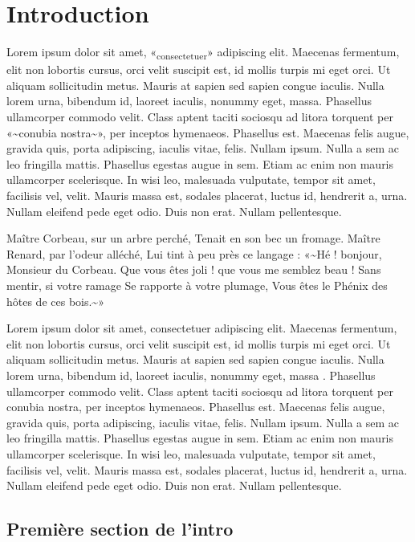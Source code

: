 \hypertarget{introduction}{%
\chapter*{Introduction}\label{introduction}}

Lorem ipsum dolor sit amet, «\textsubscript{consectetuer}» adipiscing
elit. Maecenas fermentum, elit non lobortis cursus, orci velit suscipit
est, id mollis turpis mi eget orci. Ut aliquam sollicitudin metus.
Mauris at sapien sed sapien congue iaculis. Nulla lorem urna, bibendum
id, laoreet iaculis, nonummy eget, massa. Phasellus ullamcorper commodo
velit. Class aptent taciti sociosqu ad litora torquent per
«\textasciitilde conubia nostra\textasciitilde», per inceptos hymenaeos.
Phasellus est. Maecenas felis augue, gravida quis, porta adipiscing,
iaculis vitae, felis. Nullam ipsum. Nulla a sem ac leo fringilla mattis.
Phasellus egestas augue in sem. Etiam ac enim non mauris ullamcorper
scelerisque. In wisi leo, malesuada vulputate, tempor sit amet,
facilisis vel, velit. Mauris massa est, sodales placerat, luctus id,
hendrerit a, urna. Nullam eleifend pede eget odio. Duis non erat. Nullam
pellentesque.

Maître Corbeau, sur un arbre perché, Tenait en son bec un fromage.
Maître Renard, par l'odeur alléché, Lui tint à peu près ce langage :
«\textasciitilde Hé ! bonjour, Monsieur du Corbeau. Que vous êtes joli !
que vous me semblez beau ! Sans mentir, si votre ramage Se rapporte à
votre plumage, Vous êtes le Phénix des hôtes de ces
bois.\textasciitilde»

Lorem ipsum dolor sit amet, consectetuer adipiscing elit. Maecenas
fermentum, elit non lobortis cursus, orci velit suscipit est, id mollis
turpis mi eget orci. Ut aliquam sollicitudin metus. Mauris at sapien sed
sapien congue iaculis. Nulla lorem urna, bibendum id, laoreet iaculis,
nonummy eget, massa \autocite{Pierre1901}. Phasellus ullamcorper commodo
velit. Class aptent taciti sociosqu ad litora torquent per conubia
nostra, per inceptos hymenaeos. Phasellus est. Maecenas felis augue,
gravida quis, porta adipiscing, iaculis vitae, felis. Nullam ipsum.
Nulla a sem ac leo fringilla mattis. Phasellus egestas augue in sem.
Etiam ac enim non mauris ullamcorper scelerisque. In wisi leo, malesuada
vulputate, tempor sit amet, facilisis vel, velit. Mauris massa est,
sodales placerat, luctus id, hendrerit a, urna. Nullam eleifend pede
eget odio. Duis non erat. Nullam pellentesque.

\hypertarget{premiuxe8re-section-de-lintro}{%
\section*{Première section de
l'intro}\label{premiuxe8re-section-de-lintro}}

